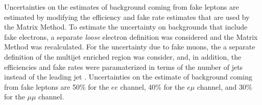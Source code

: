 Uncertainties on the estimates of background coming from fake leptons are estimated by modifying the efficiency and fake rate estimates that
are used by the Matrix Method.
To estimate the uncertainty on backgrounds that include fake electrons, a separate {\it loose} electron definition was considered and the Matrix Method was recalculated.
For the uncertainty due to fake muons, the a separate definition of the multijet enriched region was consider, and, in addition, the efficiencies and fake rates were paramaterized in terms of the number of jets instead of the leading jet \pT{}.
Uncertainties on the estimate of background coming from fake leptons are 50\% for the $ee$ channel, 40\% for the $e\mu$ channel, and 30\% for the $\mu\mu$ channel.








